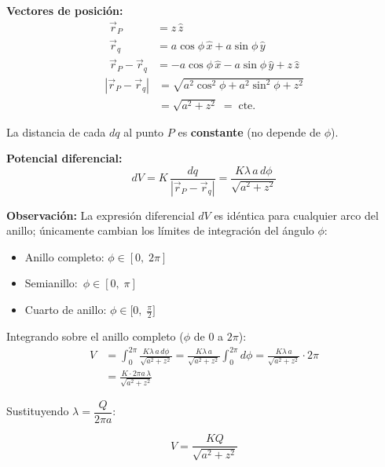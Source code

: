\documentclass[12pt,letterpaper]{article}
\begin{document}
\begin{minipage}[t]{0.54\textwidth}
    \vspace{0.3cm}
    \textbf{Vectores de posici\'on:}
    \begin{align*}
        \vec{r}_{P} &= z\,\hat{z} \\[4pt]
        \vec{r}_{q} &= a\cos\phi\,\hat{x} + a\sin\phi\,\hat{y} \\[4pt]
        \vec{r}_{P} - \vec{r}_{q} &= -a\cos\phi\,\hat{x}
                                     - a\sin\phi\,\hat{y}
                                     + z\,\hat{z}
    \end{align*}
    \begin{align*}
        |\vec{r}_{P} - \vec{r}_{q}|
          &= \sqrt{a^2\cos^2\!\phi + a^2\sin^2\!\phi + z^2} \\
          &= \sqrt{a^2 + z^2} \;=\; \text{cte.}
    \end{align*}

    \smallskip
    La distancia de cada $dq$ al punto $P$ es \textbf{constante}
    (no depende de $\phi$).

    \bigskip
    \textbf{Potencial diferencial:}
    \[
        dV = K\,\frac{dq}{|\vec{r}_{P}-\vec{r}_{q}|}
           = \frac{K\lambda\,a\,d\phi}{\sqrt{a^2+z^2}}
    \]
\end{minipage}

\bigskip

\noindent\textbf{Observaci\'on:} La expresi\'on diferencial $dV$ es id\'entica para cualquier arco del anillo; \'unicamente cambian los l\'imites de integraci\'on del \'angulo $\phi$:
\begin{itemize}
    \item Anillo completo: \quad$\phi \in [0,\; 2\pi]$
    \item Semianillo: \quad\quad\;\,$\phi \in [0,\; \pi]$
    \item Cuarto de anillo: \;$\phi \in \bigl[0,\; \tfrac{\pi}{2}\bigr]$
\end{itemize}

\bigskip

\noindent Integrando sobre el anillo completo ($\phi$ de $0$ a $2\pi$):
\begin{align*}
    V &= \int_0^{2\pi} \frac{K\lambda\,a\,d\phi}{\sqrt{a^2+z^2}}
       = \frac{K\lambda\,a}{\sqrt{a^2+z^2}} \int_0^{2\pi} d\phi
       = \frac{K\lambda\,a}{\sqrt{a^2+z^2}} \cdot 2\pi \\[6pt]
      &= \frac{K\cdot 2\pi a\,\lambda}{\sqrt{a^2+z^2}}
\end{align*}

\noindent Sustituyendo $\lambda = \dfrac{Q}{2\pi a}$:

\[
    \boxed{V = \frac{KQ}{\sqrt{a^2+z^2}}}
\]
\end{document}
